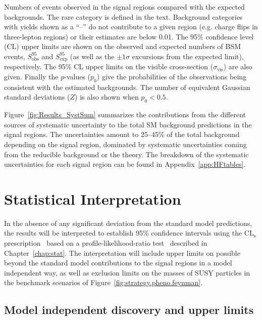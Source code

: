 \begin{table}
\begin{center}
\vspace*{1cm}

\vspace*{-0.01\textheight}\caption{Numbers of events observed in the signal regions compared with the expected backgrounds. 
The rare category is defined in the text. Background categories with yields shown as a ``--'' 
do not contribute to a given region (e.g. charge flips in three-lepton regions) or their estimates are below 0.01. 
The 95\% confidence level (CL) upper limits are shown on the observed and expected numbers of BSM events, $S_{\textrm{obs}}^{95}$ and $S_{\textrm{exp}}^{95}$ 
(as well as the $\pm 1\sigma$ excursions from the expected limit), respectively. The 95\% CL upper limits on the visible cross-section 
($\sigma_{\textrm{vis}}$) are also given. Finally the $p$-values ($p_{0}$) give the probabilities of the observations being consistent 
with the estimated backgrounds. The number of equivalent Gaussian standard deviations ($Z$) is also shown when $p_{0}<0.5$.}
\label{tab:SR_yields}
\end{center}
\end{table}

Figure~\ref{fig:Results_SystSum} summarizes the contributions from the different sources of systematic uncertainty 
to the total SM background predictions in the signal regions. The uncertainties amount to 25--45\% of the 
total background depending on the signal region, dominated by systematic uncertainties coming from the reducible background or the theory. 
The breakdown of the systematic uncertainties for each signal region can be found in Appendix~\ref{app:HFtables}.

\section{Statistical Interpretation}

In the absence of any significant deviation from the standard model predictions,
the results will be interpreted to 
 establish 95\% confidence intervals using the CL$_\mathrm{s}$ prescription~\cite{Read:2002hq} 
based on a profile-likelihood-ratio test~\cite{Cowan:2010js}
 described in Chapter~\ref{chap:stat}.
The interpretation will include upper limits on possible beyond the standard model contributions to the signal 
regions in a model independent way,
as well as exclusion limits on the masses of 
SUSY particles in the benchmark scenarios of Figure~\ref{fig:strategy.pheno.feynman}. 

\subsection{Model independent discovery and upper limits}

